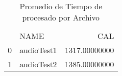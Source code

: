 \begin{table}
\caption{Promedio de Tiempo de procesado por Archivo}
\begin{tabular}{llr}
 & NAME & CAL \\
0 & audioTest1 & 1317.00000000 \\
1 & audioTest2 & 1385.00000000 \\
\end{tabular}
\end{table}
